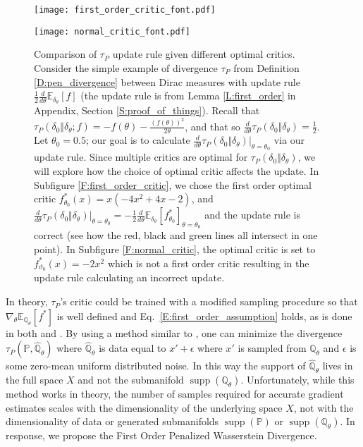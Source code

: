 \documentclass{article}
\DeclareMathOperator{\supp}{supp}
\begin{document}
 \begin{figure}
\begin{minipage}[b]{.5\linewidth}
\centering
\texttt{[image: first\_order\_critic\_font.pdf]}
\label{F:first_order_critic}
\end{minipage}\begin{minipage}[b]{.5\linewidth}
\centering
\texttt{[image: normal\_critic\_font.pdf]}
\label{F:normal_critic}
\end{minipage}
\caption{
Comparison of $\tau_P$ update rule given different optimal critics.
Consider the simple example of divergence $\tau_P$ from Definition \ref{D:pen_divergence} between Dirac measures 
with update rule $\frac 1 2 \frac{d}{d\theta}\mathbb E_{\delta_\theta}[f]$
(the update rule is from Lemma \ref{L:first_order} in Appendix, Section \ref{S:proof_of_things}).
Recall that $\tau_P(\delta_0\Vert\delta_\theta;f)=-f(\theta)-\frac{(f(\theta))^2}{2\theta}$, and that so $\frac{d}{d\theta}\tau_P(\delta_0\Vert\delta_\theta)=\frac 1 2$.
Let $\theta_0=0.5$; our goal is to calculate $\frac{d}{d\theta}\tau_P(\delta_0\Vert\delta_\theta)|_{\theta=\theta_0}$ via our update rule.
Since multiple critics are optimal for $\tau_P(\delta_0\Vert\delta_\theta)$, we will explore how the choice of optimal critic affects the update.
In Subfigure \ref{F:first_order_critic}, we chose the first order optimal critic $f^*_{\theta_0}(x)=x(-4x^2 + 4x - 2)$, and
$\frac{d}{d\theta}\tau_P(\delta_0\Vert\delta_\theta)|_{\theta=\theta_0}=-\frac 1 2 \frac{d}{d\theta}\mathbb E_{\delta_\theta}[f^*_{\theta_0}]_{\theta=\theta_0}$
and the update rule is correct (see how the red, black and green lines all intersect in one point). In Subfigure \ref{F:normal_critic},
the optimal critic is set to $f^*_{\vartheta_0}(x)=-2x^2$ which is not a first order critic
resulting in the update rule calculating an incorrect update.
}\label{F:example}
\end{figure}
 
 In theory, $\tau_P$'s critic could be trained with a modified sampling procedure so that $\nabla_\theta\mathbb E_{\mathbb Q_\theta}[f^*]$
 is well defined and Eq.\ \ref{E:first_order_assumption} holds, as is done in both \cite{dragan} and \cite{unterthiner2017coulomb}.
 By using a method similar to \cite{bishop1998gtm}, one can minimize the divergence $\tau_P(\mathbb P,\hat {\mathbb Q}_\theta)$
 where $\hat {\mathbb Q}_\theta$ is data equal to $x'+\epsilon$ where $x'$ is sampled from $\mathbb Q_\theta$ and $\epsilon$ is some zero-mean
 uniform distributed noise. In this way the support
 of $\hat {\mathbb Q}_\theta$ lives in the full space $X$ and not the submanifold $\supp(\mathbb Q_\theta)$.
 Unfortunately, while this method works in theory,
 the number of samples required for accurate gradient estimates scales with the dimensionality of the underlying space $X$,
 not with the dimensionality of data or generated submanifolds $\supp(\mathbb P)$ or $\supp(\mathbb Q_\theta)$.
 In response, we propose the First Order Penalized Wasserstein Divergence.
 
\end{document}
